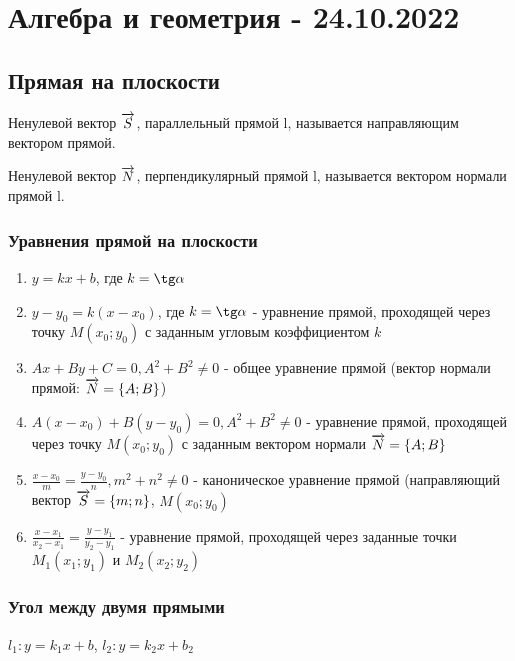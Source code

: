 \documentclass{article}
\def\vec{\ensuremath\overrightarrow}
\begin{document}
\pagebreak
\section{Алгебра и геометрия - 24.10.2022}

\subsection{Прямая на плоскости}

\begin{flushleft}

Ненулевой вектор $\vec{S}$, параллельный прямой l, называется направляющим вектором прямой.

Ненулевой вектор $\vec{N}$, перпендикулярный прямой l, называется вектором нормали прямой l.

\subsubsection{Уравнения прямой на плоскости}

\begin{enumerate}
    \item $y = k x + b$, где $k = \tg \alpha$
    \item $y - y_0 = k (x - x_0)$, где $k = \tg \alpha$ - уравнение прямой, проходящей через точку $M(x_0; y_0)$ с заданным угловым коэффициентом $k$
    \item $A x + B y + C = 0, A^2 + B^2 \ne 0$ - общее уравнение прямой (вектор нормали прямой: $\vec{N} = \{ A; B \}$)
    \item $A (x - x_0) + B(y - y_0) = 0, A^2 + B^2 \ne 0$ - уравнение прямой, проходящей через точку $M(x_0; y_0)$ с заданным вектором нормали $\vec{N} = \{ A; B \}$
    \item $\frac{x - x_0}{m} = \frac{y - y_0}{n}, m^2 + n^2 \ne 0$ - каноническое уравнение прямой (направляющий вектор $\vec{S} = \{ m; n \}$, $M(x_0; y_0)$
    \item $\frac{x - x_1}{x_2 - x_1} = \frac{y - y_1}{y_2 - y_1}$ - уравнение прямой, проходящей через заданные точки $M_1(x_1; y_1)$ и $M_2(x_2; y_2)$
\end{enumerate}

\subsubsection{Угол между двумя прямыми}

$l_1: y = k_1 x + b$, $l_2: y = k_2 x + b_2$


\end{flushleft}
\end{document}
